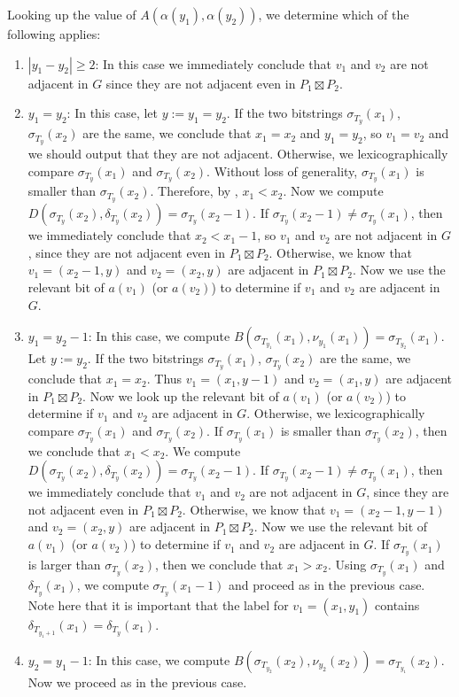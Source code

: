 \documentclass[kpfonts]{patmorin}
\let\ge\geqslant
\begin{document}
Looking up the value of $A(\alpha(y_1),\alpha(y_2))$, we determine which of the following applies:
\begin{enumerate}
  \item $|y_1-y_2|\ge 2$: In this case we immediately conclude that $v_1$ and $v_2$ are not adjacent in $G$ since they are not adjacent even in $P_1\boxtimes P_2$. %

  \item $y_1=y_2$: In this case, let $y:=y_1=y_2$.
  If the two bitstrings $\sigma_{T_y}(x_1)$, $\sigma_{T_y}(x_2)$ are the same,
  we conclude that $x_1=x_2$ and $y_1=y_2$, so $v_1=v_2$ and we should output that they are not adjacent.
  Otherwise, we
  lexicographically compare $\sigma_{T_y}(x_1)$ and $\sigma_{T_y}(x_2)$.
  Without loss of generality, $\sigma_{T_y}(x_1)$ is smaller than $\sigma_{T_y}(x_2)$.
  Therefore, by , $x_1<x_2$.
  Now we compute $D(\sigma_{T_y}(x_2),\delta_{T_y}(x_2))=\sigma_{T_y}(x_2-1)$. If $\sigma_{T_y}(x_2-1)\neq \sigma_{T_y}(x_1)$, then we immediately conclude that $x_2 < x_1-1$, so $v_1$ and $v_2$ are not adjacent in $G$, since they are not adjacent even in $P_1\boxtimes P_2$.  Otherwise, we know that
  $v_1=(x_2-1,y)$ and $v_2=(x_2,y)$ are adjacent in $P_1\boxtimes P_2$.
  Now we use the relevant bit of $a(v_1)$ (or $a(v_2)$) to determine if $v_1$ and $v_2$ are adjacent in $G$.

  \item $y_1=y_2-1$:
  In this case, we compute $B(\sigma_{T_{y_1}}(x_1), \nu_{y_1}(x_1))=\sigma_{T_{y_2}}(x_1)$.
  Let $y:=y_2$.
  If the two bitstrings $\sigma_{T_y}(x_1)$, $\sigma_{T_y}(x_2)$ are the same,
  we conclude that $x_1=x_2$. Thus $v_1=(x_1,y-1)$ and $v_2=(x_1,y)$ are adjacent in $P_1\boxtimes P_2$.
  Now we look up the relevant bit of $a(v_1)$ (or $a(v_2)$) to determine
  if $v_1$ and $v_2$ are adjacent in $G$.
  Otherwise, we lexicographically compare $\sigma_{T_y}(x_1)$ and $\sigma_{T_y}(x_2)$.
  If $\sigma_{T_y}(x_1)$ is smaller than $\sigma_{T_y}(x_2)$, then we conclude that $x_1<x_2$.
  We compute $D(\sigma_{T_y}(x_2),\delta_{T_y}(x_2))=\sigma_{T_y}(x_2-1)$.
  If $\sigma_{T_y}(x_2-1)\neq \sigma_{T_y}(x_1)$, then we immediately conclude that $v_1$ and $v_2$ are not adjacent in $G$, since they are not adjacent even in $P_1\boxtimes P_2$.  Otherwise, we know that
  $v_1=(x_2-1,y-1)$ and $v_2=(x_2,y)$ are adjacent in $P_1\boxtimes P_2$.
  Now we use the relevant bit of $a(v_1)$ (or $a(v_2)$) to determine if $v_1$ and $v_2$ are adjacent in $G$.
  If $\sigma_{T_y}(x_1)$ is larger than $\sigma_{T_y}(x_2)$, then we conclude that $x_1>x_2$.
  Using $\sigma_{T_y}(x_1)$ and $\delta_{T_y}(x_1)$, we compute $\sigma_{T_y}(x_1-1)$ and proceed as in the previous case.
  Note here that it is important that the label for $v_1=(x_1,y_1)$ contains $\delta_{T_{y_1+1}}(x_1)=\delta_{T_{y}}(x_1)$.

  \item $y_2=y_1-1$: In this case, we compute $B(\sigma_{T_{y_2}}(x_2),\nu_{y_2}(x_2))=\sigma_{T_{y_1}}(x_2)$.  Now we proceed as in the previous case.
\end{enumerate}
\end{document}
